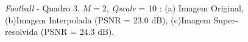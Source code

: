 \begin{figure}[h]
    \centering
    \qquad
	

    \caption{\textit{Football} - Quadro 3, $M = 2$, \textit{Qscale} = 10 : (a) Imagem Original, (b)Imagem Interpolada (PSNR = 23.0 dB), (c)Imagem Super-resolvida (PSNR = 24.3 dB).}
	    
    \label{fig:5}
\end{figure}

